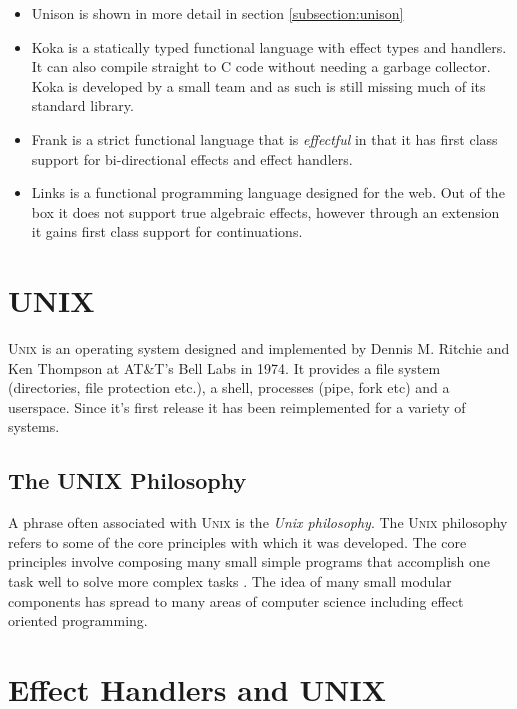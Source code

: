 \documentclass[logo,bsc,singlespacing,parskip]{infthesis}
\begin{document}
\begin{itemize}
        \item{Unison is shown in more detail in section \ref{subsection:unison}}
        \item{Koka \cite{DBLP:journals/corr/Leijen14} is a statically typed
functional language with effect types and handlers. It can also compile
straight to C code without needing a garbage collector. Koka is developed by a
small team and as such is still missing much of its standard library.}
        \item{Frank \cite{DBLP:conf/popl/LindleyMM17} is a strict functional
language that is \emph{effectful} in that it has first class support for
bi-directional effects and effect handlers. }
        \item{Links \cite{DBLP:conf/fmco/CooperLWY06} is a functional
programming language designed for the web. Out of the box it does not support
true algebraic effects, however through an extension
\cite{DBLP:conf/icfp/HillerstromL16} it gains first class support for
continuations.}
\end{itemize}


\section{\textsc{UNIX}}

\textsc{Unix} \cite{ritchie1978unix} is an operating system designed and
implemented by Dennis M. Ritchie and Ken Thompson at AT\&T's Bell Labs in 1974.
It provides a file system (directories, file protection etc.), a shell,
processes (pipe, fork etc) and a userspace. Since it's first release it has been
reimplemented for a variety of systems.

\subsection{The UNIX Philosophy}

A phrase often associated with \textsc{Unix} is the \emph{Unix philosophy}.  The
\textsc{Unix} philosophy refers to some of the core principles with which it was
developed. The core principles involve composing many small simple programs that
accomplish one task well to solve more complex tasks \cite{raymond2003art}. The
idea of many small modular components has spread to many areas of computer
science including effect oriented programming.

\section{Effect Handlers and UNIX}
\end{document}
